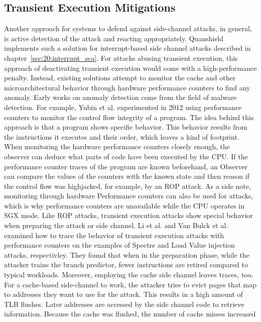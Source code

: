 \subsection{Transient Execution Mitigations}
Another approach for systems to defend against side-channel attacks, in general,
is active detection of the attack and reacting appropriately. Quanshield
implements such a solution for interrupt-based side channel attacks described in
chapter~\ref{sec:20:interrupt_sca}. For attacks abusing transient execution,
this approach of deactivating transient execution would come with a
high-performance penalty. Instead, existing solutions attempt to monitor the
cache and other microarchitectural behavior through hardware performance
counters to find any anomaly. Early works on anomaly detection come from the
field of malware detection. For example, Yubin et al. experimented in 2012 using
performance counters to monitor the control flow integrity of a program.
\cite{yubin_xia_cfimon_2012} The idea behind this approach is that a program
shows specific behavior. This behavior results from the instructions it executes
and their order, which leaves a kind of footprint. When monitoring the hardware
performance counters closely enough, the observer can deduce what parts of code
have been executed by the CPU. If the performance counter traces of the program
are known beforehand, an Observer can compare the values of the counters with
the known state and then reason if the control flow was highjacked, for example,
by an ROP attack. As a side note, monitoring through hardware Performance
counters can also be used for attacks, which is why performance counters are
unavailable while the CPU operates in SGX mode.
\cite{uhsadel2008exploiting,costan2016intel} Like ROP attacks, transient
execution attacks show special behavior when preparing the attack or side
channel. Li et al. and Van Bulck et al. examined how to trace the behavior of
transient execution attacks with performance counters on the examples of Spectre
and Load Value injection attacks, respectivley.
\cite{li_detecting_2021, van_bulck_lvi_2020}
They found that when in the preparation phase, while the attacker trains the
branch predictor, fewer instructions are retired compared to typical workloads.
Moreover, employing the cache side channel leaves traces, too. For a cache-based
side-channel to work, the attacker tries to evict pages that map to addresses
they want to use for the attack. This results in a high amount of TLB flushes.
Later addresses are accessed by the side channel code to retrieve information.
Because the cache was flushed, the number of cache misses increased

